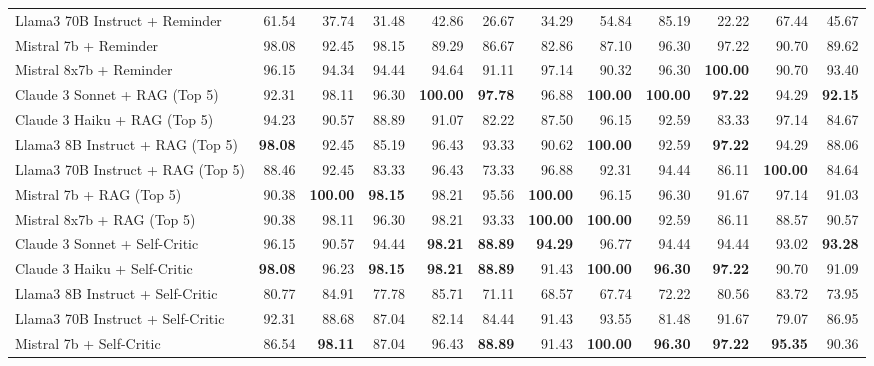 \begin{table}[H]
{\begin{tabular}{lrrrrrrrrrrr}
\rowcolor{Gray}
Llama3 70B Instruct + Reminder & 61.54 & 37.74 & 31.48 & 42.86 & 26.67 & 34.29 & 54.84 & 85.19 & 22.22 & 67.44 & 45.67 \\
\rowcolor{Gray}
Mistral 7b + Reminder & 98.08 & 92.45 & 98.15 & 89.29 & 86.67 & 82.86 & 87.10 & 96.30 & 97.22 & 90.70 & 89.62 \\
\rowcolor{Gray}
Mistral 8x7b + Reminder & 96.15 & 94.34 & 94.44 & 94.64 & 91.11 & 97.14 & 90.32 & 96.30 & \textbf{100.00} & 90.70 & 93.40 \\
Claude 3 Sonnet + RAG (Top 5) & 92.31 & 98.11 & 96.30 & \textbf{100.00} & \textbf{97.78} & 96.88 & \textbf{100.00} & \textbf{100.00} & \textbf{97.22} & 94.29 & \textbf{92.15} \\
Claude 3 Haiku + RAG (Top 5) & 94.23 & 90.57 & 88.89 & 91.07 & 82.22 & 87.50 & 96.15 & 92.59 & 83.33 & 97.14 & 84.67 \\
Llama3 8B Instruct + RAG (Top 5) & \textbf{98.08} & 92.45 & 85.19 & 96.43 & 93.33 & 90.62 & \textbf{100.00} & 92.59 & \textbf{97.22} & 94.29 & 88.06 \\
Llama3 70B Instruct + RAG (Top 5) & 88.46 & 92.45 & 83.33 & 96.43 & 73.33 & 96.88 & 92.31 & 94.44 & 86.11 & \textbf{100.00} & 84.64 \\
Mistral 7b + RAG (Top 5) & 90.38 & \textbf{100.00} & \textbf{98.15} & 98.21 & 95.56 & \textbf{100.00} & 96.15 & 96.30 & 91.67 & 97.14 & 91.03 \\
Mistral 8x7b + RAG (Top 5) & 90.38 & 98.11 & 96.30 & 98.21 & 93.33 & \textbf{100.00} & \textbf{100.00} & 92.59 & 86.11 & 88.57 & 90.57 \\
\rowcolor{Gray}
Claude 3 Sonnet + Self-Critic & 96.15 & 90.57 & 94.44 & \textbf{98.21} & \textbf{88.89} & \textbf{94.29} & 96.77 & 94.44 & 94.44 & 93.02 & \textbf{93.28} \\
\rowcolor{Gray}
Claude 3 Haiku + Self-Critic & \textbf{98.08} & 96.23 & \textbf{98.15} & \textbf{98.21} & \textbf{88.89} & 91.43 & \textbf{100.00} & \textbf{96.30} & \textbf{97.22} & 90.70 & 91.09 \\
\rowcolor{Gray}
Llama3 8B Instruct + Self-Critic & 80.77 & 84.91 & 77.78 & 85.71 & 71.11 & 68.57 & 67.74 & 72.22 & 80.56 & 83.72 & 73.95 \\
\rowcolor{Gray}
Llama3 70B Instruct + Self-Critic & 92.31 & 88.68 & 87.04 & 82.14 & 84.44 & 91.43 & 93.55 & 81.48 & 91.67 & 79.07 & 86.95 \\
\rowcolor{Gray}
Mistral 7b + Self-Critic & 86.54 & \textbf{98.11} & 87.04 & 96.43 & \textbf{88.89} & 91.43 & \textbf{100.00} & \textbf{96.30} & \textbf{97.22} & \textbf{95.35} & 90.36 \\

\end{tabular}}
\end{table}
